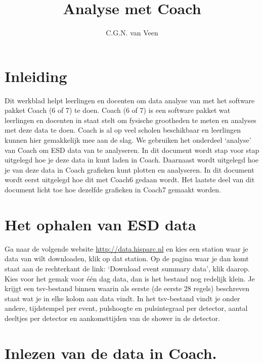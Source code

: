 

\title{Analyse met Coach}
\author{C.G.N. van Veen}



\maketitle

\section{Inleiding}

Dit werkblad helpt leerlingen en docenten om data analyse van \hisparc met
het software pakket Coach (6 of 7) te doen. Coach (6 of 7) is een software pakket wat leerlingen
en docenten in staat stelt om fysische grootheden te meten en analyses met deze
data te doen. Coach is al op veel scholen beschikbaar en leerlingen kunnen hier
gemakkelijk mee aan de slag.
We gebruiken het onderdeel `analyse' van Coach om ESD data van \hisparc te analyseren.
In dit document wordt stap voor stap uitgelegd hoe je deze data in kunt laden in
Coach. Daarnaast wordt uitgelegd hoe je van deze data in Coach
grafieken kunt plotten en analyseren. In dit document wordt eerst uitgelegd hoe
dit met Coach6 gedaan wordt. Het laatste deel van dit document licht toe hoe dezelfde grafieken
in Coach7 gemaakt worden.

\section{Het ophalen van ESD data}

Ga naar de volgende website \url{http://data.hisparc.nl} en kies een station waar
je data van wilt downloaden, klik op dat station. Op de pagina waar je dan komt
staat aan de rechterkant de link: `Download event summary data', klik daarop.
Kies voor het gemak voor één dag data, dan is het bestand nog redelijk klein.
Je krijgt een tsv-bestand binnen waarin als eerste (de eerste 28 regels) beschreven staat wat je
in elke kolom aan data vindt. In het tsv-bestand vindt je onder andere, tijdstempel per event,
pulshoogte en pulsintegraal per detector, aantal deeltjes per detector en aankomsttijden van
de shower in de detector.

\section{Inlezen van de data in Coach.}

